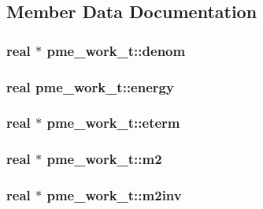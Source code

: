 \subsection{\-Member \-Data \-Documentation}
\hypertarget{structpme__work__t_a1d79fd2f71916147be678b496da7c696}{
\subsubsection[{denom}]{\setlength{\rightskip}{0pt plus 5cm}real $\ast$ {\bf pme\-\_\-work\-\_\-t\-::denom}}}\label{structpme__work__t_a1d79fd2f71916147be678b496da7c696}
\hypertarget{structpme__work__t_a1409ff313b16214daabd6d61191b78a9}{
\subsubsection[{energy}]{\setlength{\rightskip}{0pt plus 5cm}real {\bf pme\-\_\-work\-\_\-t\-::energy}}}\label{structpme__work__t_a1409ff313b16214daabd6d61191b78a9}
\hypertarget{structpme__work__t_a813768b2eb8077ff4d23525f438d2f53}{
\subsubsection[{eterm}]{\setlength{\rightskip}{0pt plus 5cm}real $\ast$ {\bf pme\-\_\-work\-\_\-t\-::eterm}}}\label{structpme__work__t_a813768b2eb8077ff4d23525f438d2f53}
\hypertarget{structpme__work__t_a27ccd1c58232cdc0057c49ee6a9a3436}{
\subsubsection[{m2}]{\setlength{\rightskip}{0pt plus 5cm}real $\ast$ {\bf pme\-\_\-work\-\_\-t\-::m2}}}\label{structpme__work__t_a27ccd1c58232cdc0057c49ee6a9a3436}
\hypertarget{structpme__work__t_ae0ec3b47a2cd61eaaae2acf33c0cc4d2}{
\subsubsection[{m2inv}]{\setlength{\rightskip}{0pt plus 5cm}real $\ast$ {\bf pme\-\_\-work\-\_\-t\-::m2inv}}}\label{structpme__work__t_ae0ec3b47a2cd61eaaae2acf33c0cc4d2}
